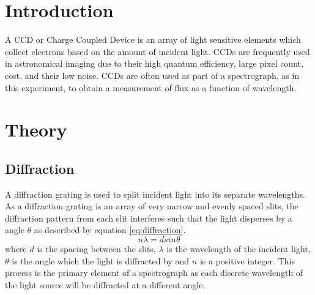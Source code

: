 \documentclass[a4paper,12pt,twocolumn]{article}
\let\cite=\supercite
\begin{document}
	
	\section{Introduction}
		A CCD or Charge Coupled Device is an array of light sensitive elements which collect electrons based on the amount of incident light\cite{specInst}. CCDs are frequently used in astronomical imaging due to their high quantum efficiency, large pixel count, cost, and their low noise. CCDs are often used as part of a spectrograph, as in this experiment, to obtain a measurement of flux as a function of wavelength\cite{manual}.
	
	\section{Theory}
		\subsection{Diffraction}
			A diffraction grating is used to split incident light into its separate wavelengths. As a diffraction grating is an array of very narrow and evenly spaced slits, the diffraction pattern from each slit interferes such that the light disperses by a angle $\theta$ as described by equation \ref{eq:diffraction}\cite{universityPhysics}.
			\begin{equation}
				n \lambda = d sin\theta
				\label{eq:diffraction}
			\end{equation} where $d$ is the spacing between the slits, 	$\lambda$ is the wavelength of the incident light, $\theta$ is the angle which the light is diffracted by and $n$ is a positive integer. This process is the primary element of a spectrograph as each discrete wavelength of the light source will be diffracted at a different angle.\\
		
\end{document}
